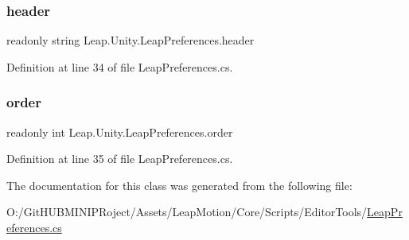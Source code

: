 \subsubsection{\texorpdfstring{header}{header}}
{\footnotesize\ttfamily readonly string Leap.\+Unity.\+Leap\+Preferences.\+header}



Definition at line 34 of file Leap\+Preferences.\+cs.

\mbox{\label{class_leap_1_1_unity_1_1_leap_preferences_a68d94071daff1ece9234af8027594f89}} 
\subsubsection{\texorpdfstring{order}{order}}
{\footnotesize\ttfamily readonly int Leap.\+Unity.\+Leap\+Preferences.\+order}



Definition at line 35 of file Leap\+Preferences.\+cs.



The documentation for this class was generated from the following file\+:\begin{DoxyCompactItemize}
\item 
O\+:/\+Git\+H\+U\+B\+M\+I\+N\+I\+P\+Roject/\+Assets/\+Leap\+Motion/\+Core/\+Scripts/\+Editor\+Tools/\mbox{\hyperlink{_leap_preferences_8cs}{Leap\+Preferences.\+cs}}\end{DoxyCompactItemize}
